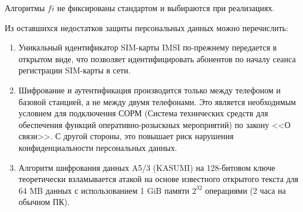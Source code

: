 Алгоритмы $fi$ не фиксированы стандартом и выбираются при реализациях.

Из оставшихся недостатков защиты персональных данных можно перечислить:
\begin{enumerate}
    \item Уникальный идентификатор SIM-карты IMSI по-прежнему передается в открытом виде, что позволяет идентифицировать абонентов по началу сеанса регистрации SIM-карты в сети.
    \item Шифрование и аутентификация производится только между телефоном и базовой станцией, а не между двумя телефонами. Это является необходимым условием для подключения СОРМ (Система технических средств для обеспечения функций оперативно-розыскных мероприятий) по закону <<О связи>>. С другой стороны, это повышает риск нарушения конфиденциальности персональных данных.
    \item Алгоритм шифрования данных A5/3 (KASUMI) на 128-битовом ключе теоретически взламывается атакой на основе известного открытого текста для 64 MB данных с использованием 1 GiB памяти $2^{32}$ операциями (2 часа на обычном ПК).
\end{enumerate}
